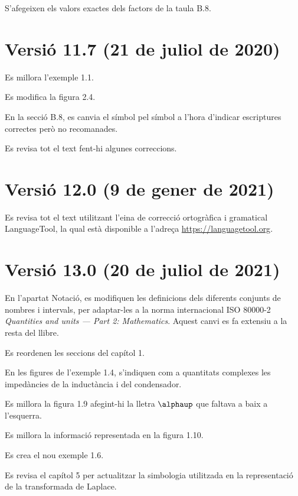 S'afegeixen els valors exactes dels factors de la taula B.8.


\section*{Versió 11.7 (21 de juliol de 2020)}

Es millora l'exemple 1.1.

Es modifica la figura 2.4.

En la secció B.8, es canvia el símbol \textcolor{Blue}\faQuestionCircle{} pel símbol \textcolor{Blue}\faExclamationTriangle{} a l'hora d'indicar escriptures correctes però no recomanades.

Es revisa tot el text fent-hi algunes correccions.


\section*{Versió 12.0 (9 de gener de 2021)}

Es revisa tot el text utilitzant l'eina de correcció ortogràfica i gramatical \textsf{LanguageTool}, la qual està disponible a l'adreça \href{https://languagetool.org/}{https://languagetool.org}.


\section*{Versió 13.0 (20 de juliol de 2021)}

En l'apartat Notació, es modifiquen les definicions dels diferents conjunts de nombres i intervals, per adaptar-les a la norma internacional ISO 80000-2 \textit{Quantities and units --- Part 2: Mathematics}. Aquest canvi es fa extensiu a la resta del llibre.

Es reordenen les seccions del capítol 1.

En les figures de l'exemple 1.4, s'indiquen com a quantitats complexes les impedàncies de la inductància i del condensador.

Es millora la figura 1.9 afegint-hi la lletra $\alphaup$ que faltava  a baix a l'esquerra.

Es millora la informació representada en la figura 1.10.

Es crea el nou exemple 1.6.

Es revisa el capítol 5 per actualitzar la simbologia utilitzada en la representació de la transformada de Laplace.

